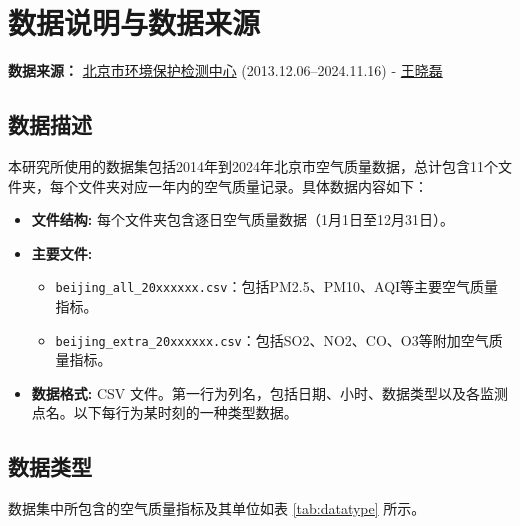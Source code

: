 \documentclass[12pt, a4paper, oneside]{ctexart}
\begin{document}
\section{数据说明与数据来源}
\textbf{数据来源：} \href{http://www.bjmemc.com.cn/}{北京市环境保护检测中心} (2013.12.06–2024.11.16) - \href{https://quotsoft.net/air/}{王晓磊}

\subsection{数据描述}
本研究所使用的数据集包括2014年到2024年北京市空气质量数据，总计包含11个文件夹，每个文件夹对应一年内的空气质量记录。具体数据内容如下：  
\begin{itemize}
    \item \textbf{文件结构:} 每个文件夹包含逐日空气质量数据（1月1日至12月31日）。
    \item \textbf{主要文件:} 
    \begin{itemize}
        \item \texttt{beijing\_all\_20xxxxxx.csv}：包括PM2.5、PM10、AQI等主要空气质量指标。
        \item \texttt{beijing\_extra\_20xxxxxx.csv}：包括SO2、NO2、CO、O3等附加空气质量指标。
    \end{itemize}
    \item \textbf{数据格式:} CSV 文件。第一行为列名，包括日期、小时、数据类型以及各监测点名。以下每行为某时刻的一种类型数据。
\end{itemize}

\subsection{数据类型}
数据集中所包含的空气质量指标及其单位如表 \ref{tab:datatype} 所示。
\end{document}
